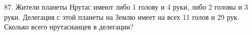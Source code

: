 87. Жители планеты Нрутас имеют либо 1 голову и 4 руки, либо 2 головы и 3 руки. Делегация с этой планеты на Землю имеет на всех 11 голов и 29 рук. Сколько всего нрутасианцев в делегации?\\
